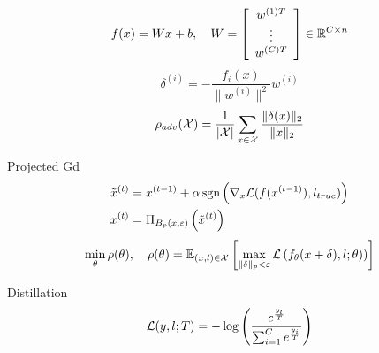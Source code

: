 \documentclass[aspectratio=169, 9pt]{beamer}
\theoremstyle{definition}
\begin{document}
\begin{frame}
  \[
    f(x) = W x + b, \quad
    W = \left[ 
      \begin{array}{c}
        w^{(1)T}\\
        \vdots\\
        w^{(C)T}
      \end{array}
    \right]\in\mathbb{R}^{C\times n}
  \]
  \[
    \delta^{(i)} = - \frac{f_i(x)}{\|w^{(i)}\|^{2}} w^{(i)}
  \]
  \[
    \rho_{adv}(\mathcal{X}) = \frac{1}{|\mathcal{X}|}\sum_{x \in\mathcal{X}}
    \frac{\|\delta(x)\|_2}{\|x\|_2}
  \]
\end{frame}
\begin{frame}{Projected Gd}
  \[
    \begin{aligned}
      \tilde x^{(t)} &= x^{(t-1)} +
    \alpha\,\mbox{sgn}\left( \nabla_x \mathcal{L}(f(x^{(t-1)}),l_{true}) \right)\\
    x^{(t)} &= \Pi_{B_p(x,\varepsilon)}\left(\tilde x^{(t)}\right)
  \end{aligned}
  \]
  \[
    \min_\theta \rho(\theta),\quad \rho(\theta) = \mathbb{E}_{(x,l)\in\mathcal{X}} \left[
  \max_{\|\delta\|_p < \varepsilon} \mathcal{L}\left( f_\theta(x+\delta),l;\theta) \right) \right]
  \]


\end{frame}

\begin{frame}{Distillation}
  \[
    \mathcal{L}(y, l; T) = -\log\left(\frac{e^{\frac{y_l}{T}}}{\sum_{i=1}^C
    e^{\frac{y_i}{T}}}\right)
  \]
\end{frame}
\end{document}
